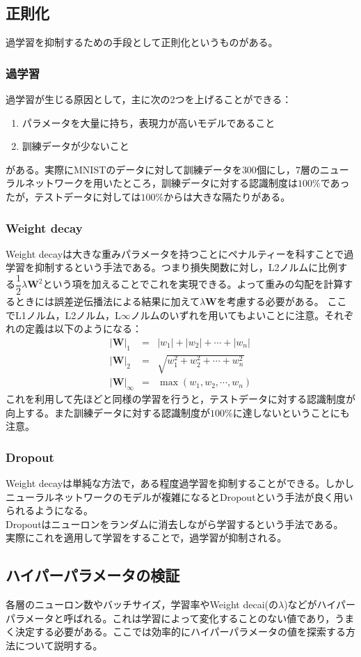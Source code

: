 \documentclass{jarticle}
\begin{document}
\subsection{正則化}
過学習を抑制するための手段として正則化というものがある。
\subsubsection{過学習}
過学習が生じる原因として，主に次の2つを上げることができる：
\begin{enumerate}
\item パラメータを大量に持ち，表現力が高いモデルであること
\item 訓練データが少ないこと
\end{enumerate}
がある。実際にMNISTのデータに対して訓練データを$300$個にし，$7$層のニューラルネットワークを用いたところ，訓練データに対する認識制度は$100\%$であったが，テストデータに対しては$100\%$からは大きな隔たりがある。
\subsubsection{Weight decay}
Weight decayは大きな重みパラメータを持つことにペナルティーを科すことで過学習を抑制するという手法である。つまり損失関数に対し，L2ノルムに比例する$\dfrac{1}{2} \lambda \bm{W}^2$という項を加えることでこれを実現できる。よって重みの勾配を計算するときには誤差逆伝播法による結果に加えて$\lambda \bm{W}$を考慮する必要がある。
ここでL1ノルム，L2ノルム，L$\infty$ノルムのいずれを用いてもよいことに注意。それぞれの定義は以下のようになる：
\begin{eqnarray*}
|\bm{W}|_1 &=& |w_1|+|w_2|+\cdots+|w_n|\\
|\bm{W}|_2 &=& \sqrt{w_1^2+w_2^2+\cdots+w_n^2}\\
|\bm{W}|_{\infty} &=& \max(w_1,w_2,\cdots,w_n)
\end{eqnarray*}
これを利用して先ほどと同様の学習を行うと，テストデータに対する認識制度が向上する。また訓練データに対する認識制度が$100\%$に達しないということにも注意。
\subsubsection{Dropout}
Weight decayは単純な方法で，ある程度過学習を抑制することができる。しかしニューラルネットワークのモデルが複雑になるとDropoutという手法が良く用いられるようになる。\\
Dropoutはニューロンをランダムに消去しながら学習するという手法である。
実際にこれを適用して学習をすることで，過学習が抑制される。
\subsection{ハイパーパラメータの検証}
各層のニューロン数やバッチサイズ，学習率やWeight decai(の$\lambda$)などがハイパーパラメータと呼ばれる。これは学習によって変化することのない値であり，うまく決定する必要がある。ここでは効率的にハイパーパラメータの値を探索する方法について説明する。
\end{document}
